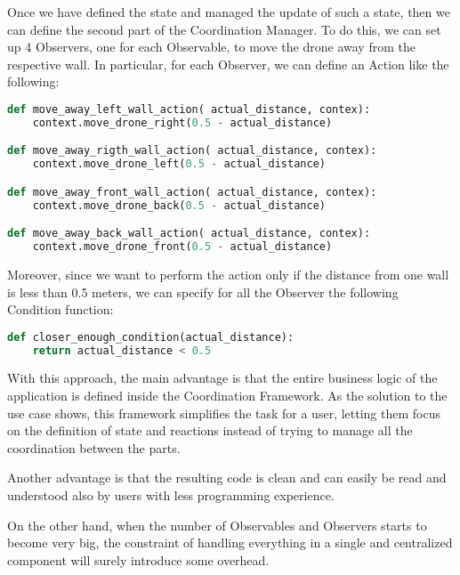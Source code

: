 Once we have defined the state and managed the update of such a state, then we can define the second part of the Coordination Manager.
To do this, we can set up 4 Observers, one for each Observable, to move the drone away from the respective wall.
In particular, for each Observer, we can define an Action like the following:

\begin{lstlisting}[language=Python]
def move_away_left_wall_action( actual_distance, contex):
	context.move_drone_right(0.5 - actual_distance)

def move_away_rigth_wall_action( actual_distance, contex):
	context.move_drone_left(0.5 - actual_distance)

def move_away_front_wall_action( actual_distance, contex):
	context.move_drone_back(0.5 - actual_distance)

def move_away_back_wall_action( actual_distance, contex):
	context.move_drone_front(0.5 - actual_distance)
\end{lstlisting}

Moreover, since we want to perform the action only if the distance from one wall is less than 0.5 meters, we can specify for all the Observer the following Condition function:

\begin{lstlisting}[language=Python]
def closer_enough_condition(actual_distance):
	return actual_distance < 0.5
\end{lstlisting}

With this approach, the main advantage is that the entire business logic of the application is defined inside the Coordination Framework.
As the solution to the use case shows, this framework simplifies the task for a user, letting them focus on the definition of state and reactions instead of trying to manage all the coordination between the parts. 

Another advantage is that the resulting code is clean and can easily be read and understood also by users with less programming experience.

On the other hand, when the number of Observables and Observers starts to become very big, the constraint of handling everything in a single and centralized component will surely introduce some overhead.
